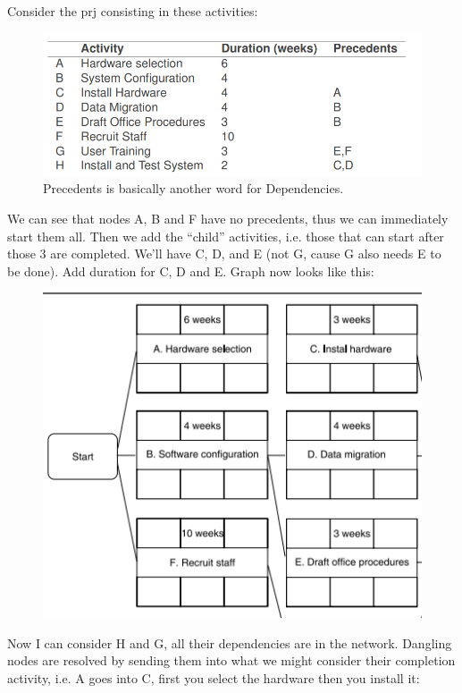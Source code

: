 \noindent Consider the prj consisting in these activities:

\begin{figure} [H]
    \centering
\includegraphics[scale=0.7]{Figures/03/cpm01.png}
    \caption{Precedents is basically another word for Dependencies.}
    \label{fig:cpm01}
\end{figure}

\noindent We can see that nodes A, B and F have no precedents, thus we can immediately start them all. Then we add the ``child'' activities, i.e. those that can start after those 3 are completed. We'll have C, D, and E (not G, cause G also needs E to be done). Add duration for C, D and E. Graph now looks like this:

\begin{figure} [H]
    \centering
    \includegraphics[scale=0.7]{Figures/03/cpm02.png}
    \label{fig:cpm02}
\end{figure}

\noindent Now I can consider H and G, all their dependencies are in the network. Dangling nodes are resolved by sending them into what we might consider their completion activity, i.e. A goes into C, first you select the hardware then you install it:

